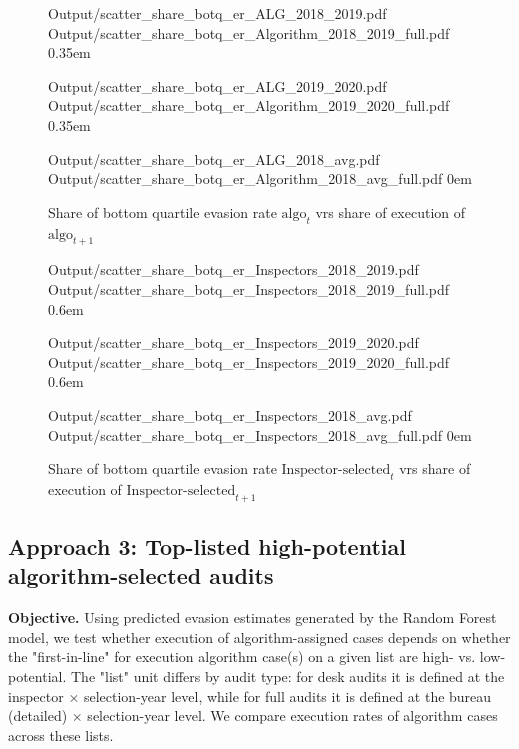 \documentclass{article}
\newcommand{\OutPath}{Output/}%
\newcommand{\OutPath}{../Output/}%
\begin{document}
\begin{figure}[H]
    \centering
    \caption{Share of bottom quartile evasion rate $\text{algo}_t$ vrs share of execution of $\text{algo}_{t+1}$}

      {\OutPath scatter_share_botq_er_ALG_2018_2019.pdf}
      {\OutPath scatter_share_botq_er_Algorithm_2018_2019_full.pdf}
      {0.35em}

      {\OutPath scatter_share_botq_er_ALG_2019_2020.pdf}
      {\OutPath scatter_share_botq_er_Algorithm_2019_2020_full.pdf}
      {0.35em}

      {\OutPath scatter_share_botq_er_ALG_2018_avg.pdf}
      {\OutPath scatter_share_botq_er_Algorithm_2018_avg_full.pdf}
      {0em}
\end{figure}

\begin{figure}[H]
    \centering
    \caption{Share of bottom quartile evasion rate $\text{Inspector-selected}_t$ vrs share of execution of $\text{Inspector-selected}_{t+1}$}

      {\OutPath scatter_share_botq_er_Inspectors_2018_2019.pdf}
      {\OutPath scatter_share_botq_er_Inspectors_2018_2019_full.pdf}
      {0.6em}

      {\OutPath scatter_share_botq_er_Inspectors_2019_2020.pdf}
      {\OutPath scatter_share_botq_er_Inspectors_2019_2020_full.pdf}
      {0.6em}

      {\OutPath scatter_share_botq_er_Inspectors_2018_avg.pdf}
      {\OutPath scatter_share_botq_er_Inspectors_2018_avg_full.pdf}
      {0em}
\end{figure}







\subsection{Approach 3: Top-listed high-potential algorithm-selected audits}

\textbf{Objective.} Using predicted evasion estimates generated by the Random Forest model, we test whether execution of algorithm-assigned cases depends on whether the "first-in-line" for execution algorithm case(s) on a given list are high- vs. low-potential. The "list" unit differs by audit type: for desk audits it is defined at the inspector $\times$ selection-year level, while for full audits it is defined at the bureau (detailed) $\times$ selection-year level. We compare execution rates of algorithm cases across these lists.
\end{document}
